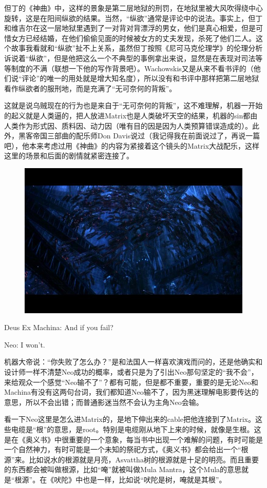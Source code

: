 \documentclass[UTF8]{ctexart}
\newenvironment{myquote}{\color{green} \setlength{\leftskip}{6em} \setlength{\rightskip}{4em} \setlength{\parindent}{-2em}}{\par}
\begin{document}
但丁的《神曲》中，这样的景象是第二层地狱的刑罚，在地狱里被大风吹得绕中心旋转，这是在阳间纵欲的结果。当然，“纵欲”通常是评论中的说法。事实上，但丁和维吉尔在这一层地狱里遇到了一对背对背漂浮的男女，他们是真心相爱，但是可惜女方已经结婚，在他们偷偷见面的时候被女方的丈夫发现，杀死了他们二人。这个故事我看就和“纵欲”扯不上关系，虽然但丁按照《尼可马克伦理学》的伦理分析诉说着“纵欲”，但是他把这么一个不典型的事例拿出来说，显然是在表现对司法等等制度的不满（联想一下他的写作背景吧）。Wachowskis又是从来不看书评的（他们说“评论”的唯一的用处就是增大知名度），所以没有和书评中那样把第二层地狱看作纵欲者的服刑地，而是充满了“无可奈何的背叛”。

这就是说乌贼现在的行为也是来自于“无可奈何的背叛”，这不难理解，机器一开始的起义就是人类逼的，把人放进Matrix也是人类破坏天空的结果，机器的sin都由人类作为形式因、质料因、动力因（唯有目的因是因为人类预算错误造成的）。此外，黑客帝国三部曲的配乐师Don Davis说过（我记得我在前面说过了，再说一篇吧），他本来考虑过用《神曲》的内容为紧接着这个镜头的Matrix大战配乐，这样这里的场景和后面的剧情就紧密连接了。

\begin{figure}[htb]
\centering
\includegraphics[width=0.5\linewidth]{fig/4c9bd62ac00a012cd42af1d3.jpg}
\end{figure}

\begin{myquote}
Deus Ex Machina: And if you fail?

Neo: I won't.
\end{myquote}

机器大帝说：“你失败了怎么办？”是和法国人一样喜欢演戏而问的，还是他确实和设计师一样不清楚Neo成功的概率，或者只是为了引出Neo那句坚定的“我不会”，来给观众一个感觉“Neo输不了”？都有可能，但是都不重要，重要的是无论Neo和Machina有没有这两句台词，我们都知道Neo输不了，因为黑迷理解电影要传达的意思，所以不会出错；而普通影迷当然不会认为主角Neo会输。

看一下Neo这里是怎么进Matrix的，是地下伸出来的cable把他连接到了Matrix。这些电缆是“根”的意思，是root。特别是电缆刚从地下上来的时候，就像是生根。这是在《奥义书》中很重要的一个意象，每当书中出现一个难解的问题，有时可能是一个自然神力，有时可能是一个未知的祭祀方式，《奥义书》都会给出一个“根源”来。比如说水的根源就是月亮，Asvattha树的根源就是十足的明亮。而且重要的东西都会被叫做根源，比如“唵”就被叫做Mula Mantra，这个Mula的意思就是“根源”。在《吠陀》中也是一样，比如说“吠陀是树，唵就是其根”。
\end{document}
